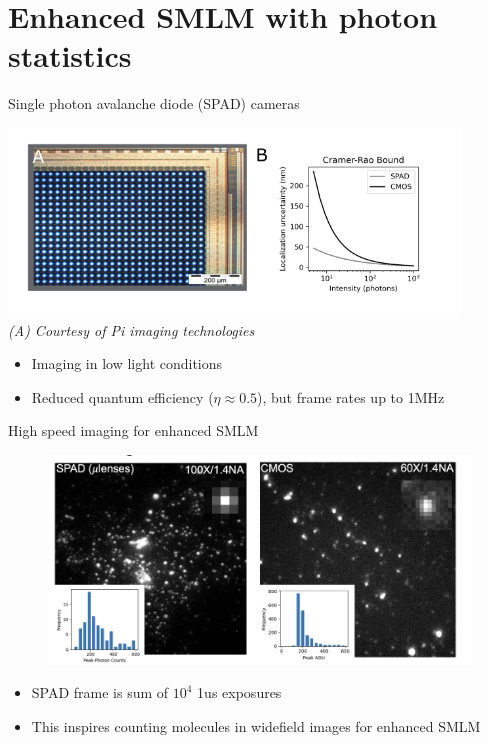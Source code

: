\documentclass{beamer}					%
\begin{document}
\section{Enhanced SMLM with photon statistics}

\begin{frame}{Single photon avalanche diode (SPAD) cameras}

\includegraphics[width=12cm]{SPAD-Intro.png}\\
\textit{(A) Courtesy of Pi imaging technologies}
\vspace{0.05in}
\begin{itemize}
\item Imaging in low light conditions
\item Reduced quantum efficiency ($\eta\approx 0.5$), but frame rates up to 1MHz
\end{itemize}


\end{frame}

\begin{frame}{High speed imaging for enhanced SMLM}
\begin{figure}
\includegraphics[width=12cm]{SPADvCMOS.png}
\end{figure}
\begin{itemize}
\item SPAD frame is sum of $10^{4}$ 1us exposures
\item This inspires counting molecules in widefield images for enhanced SMLM
\end{itemize}
\end{frame}
\end{document}
